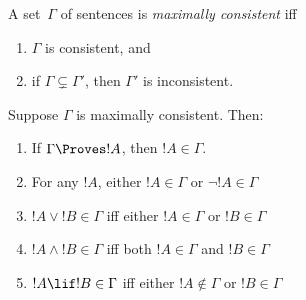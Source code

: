 \documentclass[../../include/open-logic-section]{subfiles}
\begin{document}

\begin{defn}
A set~$\Gamma$ of sentences is \emph{maximally consistent} iff
\begin{enumerate}
\item $\Gamma$ is consistent, and
\item if $\Gamma \subsetneq \Gamma'$, then $\Gamma'$ is inconsistent.
\end{enumerate}
\end{defn}

\begin{prop}
Suppose $\Gamma$ is maximally consistent. Then:
\begin{enumerate}
\item If $\Gamma \Proves !A$, then $!A \in \Gamma$.
\item For any $!A$, either $!A \in \Gamma$ or $\lnot !A \in \Gamma$
\item $!A \lor !B \in \Gamma$ iff either $!A \in \Gamma$ or $!B \in \Gamma$
\item $!A \land !B \in \Gamma$ iff both $!A \in \Gamma$ and $!B \in \Gamma$
\item $!A \lif !B \in \Gamma$ iff either $!A \notin \Gamma$ or $!B \in \Gamma$
\end{enumerate}
\end{prop}
\end{document}
